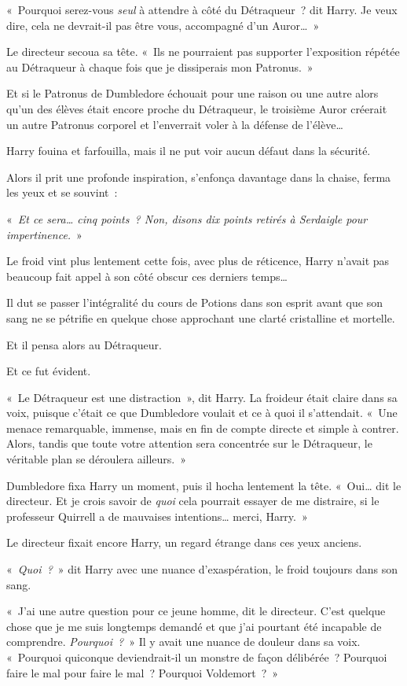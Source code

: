 «~Pourquoi serez-vous \emph{seul} à attendre à côté du Détraqueur~? dit Harry. Je veux dire, cela ne devrait-il pas être vous, accompagné d'un Auror…~»

Le directeur secoua sa tête. «~Ils ne pourraient pas supporter l'exposition répétée au Détraqueur à chaque fois que je dissiperais mon Patronus.~»

Et si le Patronus de Dumbledore échouait pour une raison ou une autre alors qu'un des élèves était encore proche du Détraqueur, le troisième Auror créerait un autre Patronus corporel et l'enverrait voler à la défense de l'élève…

Harry fouina et farfouilla, mais il ne put voir aucun défaut dans la sécurité.

Alors il prit une profonde inspiration, s'enfonça davantage dans la chaise, ferma les yeux et se souvint~:

«~\emph{Et ce sera… cinq points~? Non, disons dix points retirés à Serdaigle pour impertinence.}~»

Le froid vint plus lentement cette fois, avec plus de réticence, Harry n'avait pas beaucoup fait appel à son côté obscur ces derniers temps…

Il dut se passer l'intégralité du cours de Potions dans son esprit avant que son sang ne se pétrifie en quelque chose approchant une clarté cristalline et mortelle.

Et il pensa alors au Détraqueur.

Et ce fut évident.

«~Le Détraqueur est une distraction~», dit Harry. La froideur était claire dans sa voix, puisque c'était ce que Dumbledore voulait et ce à quoi il s'attendait. «~Une menace remarquable, immense, mais en fin de compte directe et simple à contrer. Alors, tandis que toute votre attention sera concentrée sur le Détraqueur, le véritable plan se déroulera ailleurs.~»

Dumbledore fixa Harry un moment, puis il hocha lentement la tête. «~Oui… dit le directeur. Et je crois savoir de \emph{quoi} cela pourrait essayer de me distraire, si le professeur Quirrell a de mauvaises intentions… merci, Harry.~»

Le directeur fixait encore Harry, un regard étrange dans ces yeux anciens.

«~\emph{Quoi~?}~» dit Harry avec une nuance d'exaspération, le froid toujours dans son sang.

«~J'ai une autre question pour ce jeune homme, dit le directeur. C'est quelque chose que je me suis longtemps demandé et que j'ai pourtant été incapable de comprendre. \emph{Pourquoi~?}~» Il y avait une nuance de douleur dans sa voix. «~Pourquoi quiconque deviendrait-il un monstre de façon délibérée~? Pourquoi faire le mal pour faire le mal~? Pourquoi Voldemort~?~»

